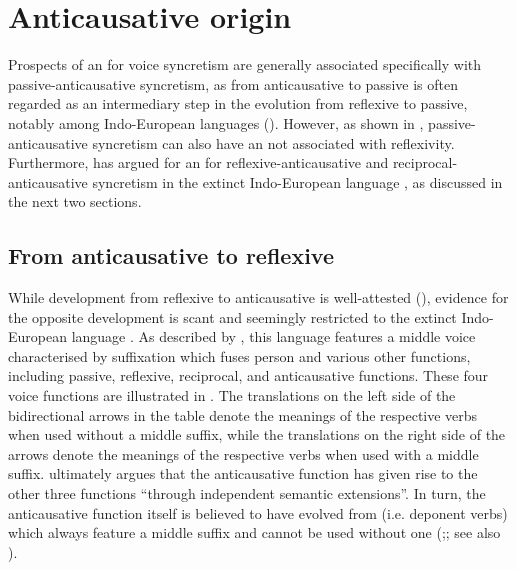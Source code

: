 \section{Anticausative origin} \label{diachrony:anticausative}
Prospects of an  for voice syncretism are generally associated specifically with passive-anticausative syncretism, as  from anticausative to passive is often regarded as an intermediary step in the evolution from reflexive to passive, notably among Indo-European languages (). However, as shown in , passive-anticausative syncretism can also have an  not associated with reflexivity. Furthermore, \cite{inglese:2020} has argued for an  for reflexive-anticausative and reciprocal-anticausative syncretism in the extinct Indo-European language , as discussed in the next two sections. 

\subsection{From anticausative to reflexive} \label{diachrony:antc2refl}
While development from reflexive to anticausative is well-attested (), evidence for the opposite development is scant and seemingly restricted to the extinct Indo-European language . As described by \cite{inglese:2020}, this language features a middle voice characterised by suffixation which fuses person  and various other functions, including passive, reflexive, reciprocal, and anticausative functions. These four voice functions are illustrated in . The translations on the left side of the bidirectional arrows in the table denote the meanings of the respective verbs when used without a middle suffix, while the translations on the right side of the arrows denote the meanings of the respective verbs when used with a middle suffix. \cite[240]{inglese:2020} ultimately argues that the anticausative function has given rise to the other three functions “through independent semantic extensions”. In turn, the anticausative function itself is believed to have evolved from  (i.e. deponent verbs) which always feature a middle suffix and cannot be used without one (\citealt[241ff.]{inglese:2020};; see also \citealt{luraghi:2012}).

